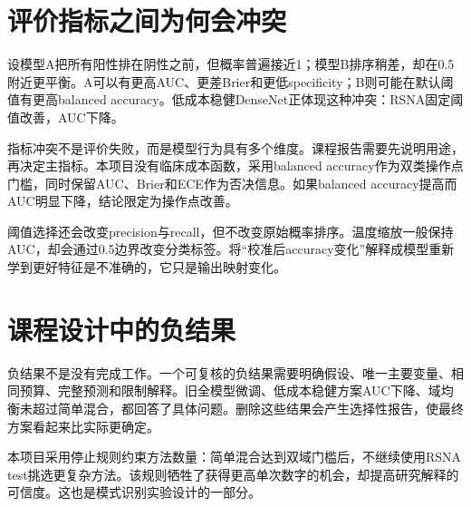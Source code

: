 \section{评价指标之间为何会冲突}

设模型A把所有阳性排在阴性之前，但概率普遍接近1；模型B排序稍差，却在0.5附近更平衡。A可以有更高AUC、更差Brier和更低specificity；B则可能在默认阈值有更高balanced accuracy。低成本稳健DenseNet正体现这种冲突：RSNA固定阈值改善，AUC下降。

指标冲突不是评价失败，而是模型行为具有多个维度。课程报告需要先说明用途，再决定主指标。本项目没有临床成本函数，采用balanced accuracy作为双类操作点门槛，同时保留AUC、Brier和ECE作为否决信息。如果balanced accuracy提高而AUC明显下降，结论限定为操作点改善。

阈值选择还会改变precision与recall，但不改变原始概率排序。温度缩放一般保持AUC，却会通过0.5边界改变分类标签。将“校准后accuracy变化”解释成模型重新学到更好特征是不准确的，它只是输出映射变化。

\section{课程设计中的负结果}

负结果不是没有完成工作。一个可复核的负结果需要明确假设、唯一主要变量、相同预算、完整预测和限制解释。旧全模型微调、低成本稳健方案AUC下降、域均衡未超过简单混合，都回答了具体问题。删除这些结果会产生选择性报告，使最终方案看起来比实际更确定。

本项目采用停止规则约束方法数量：简单混合达到双域门槛后，不继续使用RSNA test挑选更复杂方法。该规则牺牲了获得更高单次数字的机会，却提高研究解释的可信度。这也是模式识别实验设计的一部分。
